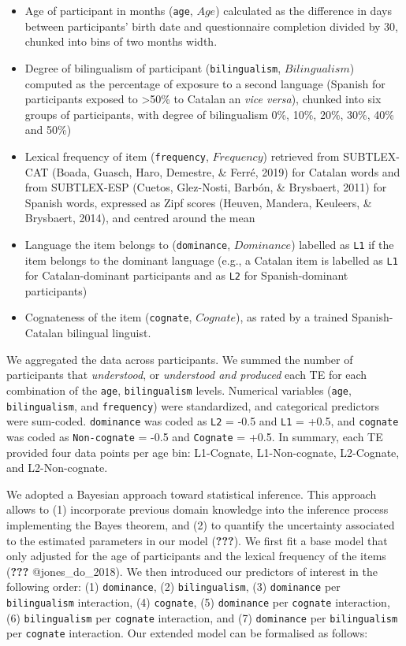\documentclass[
  english,
  man,man,floatsintext]{apa6}
\providecommand{\tightlist}{%
  \setlength{\itemsep}{0pt}\setlength{\parskip}{0pt}}
\begin{document}
\begin{itemize}
\tightlist
\item
  Age of participant in months (\texttt{age}, \(Age\)) calculated as the difference in days between participants' birth date and questionnaire completion divided by 30, chunked into bins of two months width.
\item
  Degree of bilingualism of participant (\texttt{bilingualism}, \(Bilingualism\)) computed as the percentage of exposure to a second language (Spanish for participants exposed to \textgreater50\% to Catalan an \emph{vice versa}), chunked into six groups of participants, with degree of bilingualism 0\%, 10\%, 20\%, 30\%, 40\% and 50\%)
\item
  Lexical frequency of item (\texttt{frequency}, \(Frequency\)) retrieved from SUBTLEX-CAT (Boada, Guasch, Haro, Demestre, \& Ferré, 2019) for Catalan words and from SUBTLEX-ESP (Cuetos, Glez-Nosti, Barbón, \& Brysbaert, 2011) for Spanish words, expressed as Zipf scores (Heuven, Mandera, Keuleers, \& Brysbaert, 2014), and centred around the mean
\item
  Language the item belongs to (\texttt{dominance}, \(Dominance\)) labelled as \texttt{L1} if the item belongs to the dominant language (e.g., a Catalan item is labelled as \texttt{L1} for Catalan-dominant participants and as \texttt{L2} for Spanish-dominant participants)
\item
  Cognateness of the item (\texttt{cognate}, \(Cognate\)), as rated by a trained Spanish-Catalan bilingual linguist.
\end{itemize}

We aggregated the data across participants. We summed the number of participants that \emph{understood}, or \emph{understood and produced} each TE for each combination of the \texttt{age}, \texttt{bilingualism} levels. Numerical variables (\texttt{age}, \texttt{bilingualism}, and \texttt{frequency}) were standardized, and categorical predictors were sum-coded. \texttt{dominance} was coded as \texttt{L2} = -0.5 and \texttt{L1} = +0.5, and \texttt{cognate} was coded as \texttt{Non-cognate} = -0.5 and \texttt{Cognate} = +0.5. In summary, each TE provided four data points per age bin: L1-Cognate, L1-Non-cognate, L2-Cognate, and L2-Non-cognate.

We adopted a Bayesian approach toward statistical inference. This approach allows to (1) incorporate previous domain knowledge into the inference process implementing the Bayes theorem, and (2) to quantify the uncertainty associated to the estimated parameters in our model ({\textbf{???}}). We first fit a base model that only adjusted for the age of participants and the lexical frequency of the items ({\textbf{???}} @jones\_do\_2018). We then introduced our predictors of interest in the following order: (1) \texttt{dominance}, (2) \texttt{bilingualism}, (3) \texttt{dominance} per \texttt{bilingualism} interaction, (4) \texttt{cognate}, (5) \texttt{dominance} per \texttt{cognate} interaction, (6) \texttt{bilingualism} per \texttt{cognate} interaction, and (7) \texttt{dominance} per \texttt{bilingualism} per \texttt{cognate} interaction. Our extended model can be formalised as follows:
\end{document}
